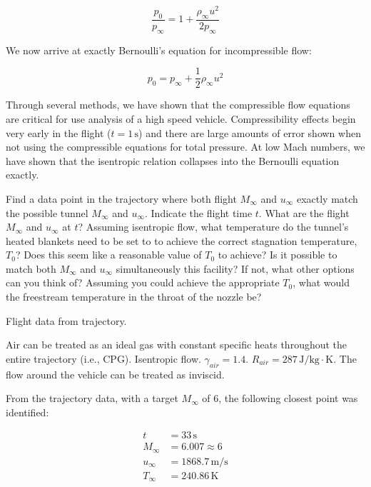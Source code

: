 \documentclass[../main.tex]{subfiles}
\begin{document}
\[
    \frac{p_0}{p_\infty} = 1 + \frac{\rho_\infty u^2}{2p_\infty}
\]

We now arrive at exactly Bernoulli's equation for incompressible flow:

\[
    \boxed{
    p_0 = p_\infty + \frac{1}{2} \rho_\infty u^2
    }
\]

\discussion{}
Through several methods, we have shown that the compressible flow equations are critical for use analysis of a high speed vehicle.
Compressibility effects begin very early in the flight (\(t=1\,\unit{\s}\)) and there are large amounts of error shown when not using the compressible equations for total pressure.
At low Mach numbers, we have shown that the isentropic relation collapses into the Bernoulli equation exactly.

\clearpage

Find a data point in the trajectory where both flight \(M_\infty\) and \(u_\infty\) exactly match the possible tunnel \(M_\infty\) and \(u_\infty\).
Indicate the flight time \(t\).
What are the flight \(M_\infty\) and \(u_\infty\) at \(t\)?
Assuming isentropic flow, what temperature do the tunnel's heated blankets need to be set to to achieve the correct stagnation temperature, \(T_0\)?
Does this seem like a reasonable value of \(T_0\) to achieve?
Is it possible to match both \(M_\infty\) and \(u_\infty\) simultaneously this facility?
If not, what other options can you think of?
Assuming you could achieve the appropriate \(T_0\), what would the freestream temperature in the throat of the nozzle be?

\givens{}
Flight data from trajectory.

\assumptions{}
Air can be treated as an ideal gas with constant specific heats throughout the entire trajectory (i.e., CPG).
Isentropic flow.
\(\gamma_{air} = 1.4\). 
\(R_{air} = 287 \, \unit{\joule/\kilogram\cdot\kelvin}\). 
The flow around the vehicle can be treated as inviscid.

\solution{}

From the trajectory data, with a target \(M_\infty\) of 6, the following closest point was identified:

\begin{align*}
    t &= 33 \, \unit{\s}\\
    M_\infty &= 6.007 \approx 6\\
    u_\infty &= 1868.7 \, \unit{\meter/\s}\\
    T_\infty &= 240.86 \, \unit{\kelvin}
\end{align*}
\end{document}
